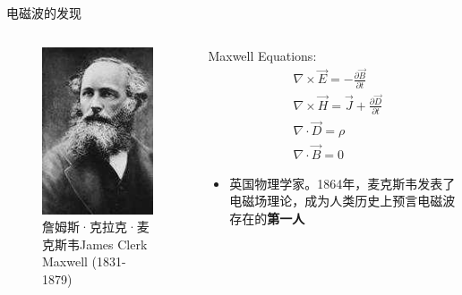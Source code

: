 \begin{frame}{电磁波的发现}
  \begin{columns}
    \begin{column}{0.35\linewidth}
      \begin{figure}
        \includegraphics[width=3.5cm]{Cha1//maxwell.jpg}
        \caption{詹姆斯·克拉克·麦克斯韦James Clerk Maxwell (1831-1879)}
      \end{figure}
    \end{column}
    \begin{column}{0.65\linewidth}
      Maxwell Equations:
      \begin{align*}
         & \nabla\times\vec E=-\frac{\partial \vec B}{\partial t}         \\
         & \nabla\times\vec H=\vec{J} +\frac{\partial \vec D}{\partial t} \\
         & \nabla\cdot\vec{D}=\rho                                        \\
         & \nabla\cdot\vec{B}=0
      \end{align*}
      \begin{itemize}
        \item 英国物理学家。1864年，麦克斯韦发表了电磁场理论，成为人类历史上预言电磁波存在的\textbf{第一人}
      \end{itemize}
    \end{column}
  \end{columns}
\end{frame}

